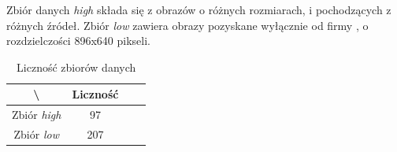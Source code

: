 Zbiór danych \textit{high} składa się z obrazów o różnych rozmiarach, i pochodzących z różnych źródeł.
Zbiór \textit{low} zawiera obrazy pozyskane wyłącznie od firmy \blue{}, o rozdzielczości 896x640 pikseli.

\begin{table}[!h]
	\centering
	\caption{Liczność zbiorów danych}
	\vspace{6pt}
	{\footnotesize
		\begin{tabular}{|c|c|c|c|}
			\hline \textbackslash & Liczność \\
      \hline Zbiór \textit{high} & 97 \\
      \hline Zbiór \textit{low} & 207 \\
      \hline
		\end{tabular}
	}
	\vspace{0pt}
\end{table}

